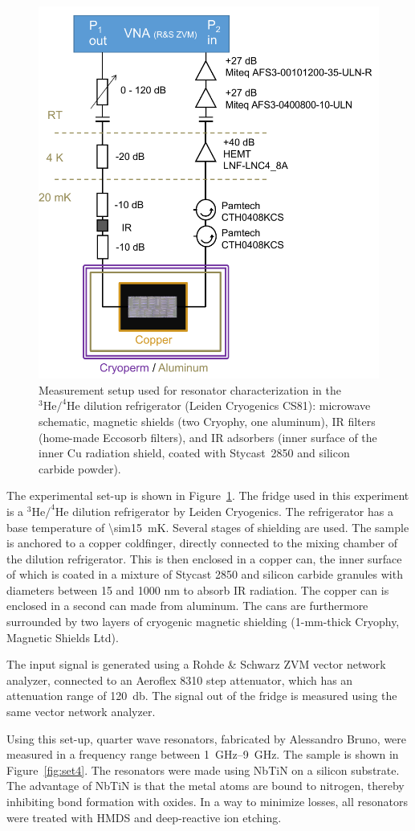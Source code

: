     \begin{figure}[!htb]
      \includegraphics[width=.5\textwidth]{Figures/DRIE/FigS2_MW_setup.pdf}
      \caption[width=\textwidth]{Measurement setup used for resonator characterization in the $^{3}\mathrm{He}/^{4}\mathrm{He}$ dilution refrigerator (Leiden Cryogenics CS81): microwave schematic, magnetic shields (two Cryophy, one aluminum), IR filters (home-made Eccosorb filters), and IR adsorbers (inner surface of the inner Cu radiation shield, coated with Stycast~2850 and silicon carbide powder).}
      \label{fig:fridges}
    \end{figure}
    The experimental set-up is shown in Figure~\ref{fig:fridges}. The fridge used in this experiment is a $^{3}\mathrm{He}/^{4}\mathrm{He}$ dilution refrigerator by Leiden Cryogenics. The refrigerator has a base temperature of \SI{\sim15}{\milli \kelvin}. Several stages of shielding are used. The sample is anchored to a copper coldfinger, directly connected to the mixing chamber of the dilution refrigerator. This is then enclosed in a copper can, the inner surface of which is coated in a mixture of Stycast 2850 and silicon carbide granules with diameters between 15 and 1000 nm to absorb IR radiation. The copper can is enclosed in a second can made from aluminum. The cans are furthermore surrounded by two layers of cryogenic magnetic shielding (1-mm-thick Cryophy, Magnetic Shields Ltd).

    The input signal is generated using a Rohde \& Schwarz ZVM vector network analyzer, connected to an Aeroflex 8310 step attenuator, which has an attenuation range of \SI{120}{\decibel}. The signal out of the fridge is measured using the same vector network analyzer.

    Using this set-up, quarter wave resonators, fabricated by Alessandro Bruno, were measured in a frequency range between \SIrange{1}{9}{\giga \hertz}. The sample is shown in Figure~\ref{fig:set4}. The resonators were made using NbTiN on a silicon substrate. The advantage of NbTiN is that the metal atoms are bound to nitrogen, thereby inhibiting bond formation with oxides. In a way to minimize losses, all resonators were treated with HMDS and deep-reactive ion etching.


